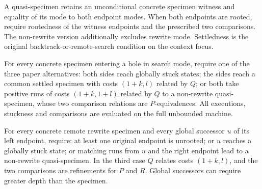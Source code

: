 




\begin{definition}
A quasi-specimen retains an unconditional concrete specimen witness and equality of its mode to both endpoint modes. When both endpoints are rooted, require rootedness of the witness endpoints and the prescribed two comparisons. The non-rewrite version additionally excludes rewrite mode. Settledness is the original backtrack-or-remote-search condition on the context focus.
\end{definition}






\begin{definition}
For every concrete specimen entering a hole in search mode, require one of the three paper alternatives: both sides reach globally stuck states; the sides reach a common settled specimen with costs $(1+k,l)$ related by $Q$; or both take positive runs of costs $(1+k,1+l)$ related by $Q$ to a non-rewrite quasi-specimen, whose two comparison relations are $P$-equivalences. All executions, stuckness and comparisons are evaluated on the full unbounded machine.
\end{definition}




\begin{definition}
For every concrete remote rewrite specimen and every global successor $u$ of its left endpoint, require: at least one original endpoint is unrooted; or $u$ reaches a globally stuck state; or matching runs from $u$ and the right endpoint lead to a non-rewrite quasi-specimen. In the third case $Q$ relates costs $(1+k,l)$, and the two comparisons are refinements for $P$ and $R$. Global successors can require greater depth than the specimen.
\end{definition}

